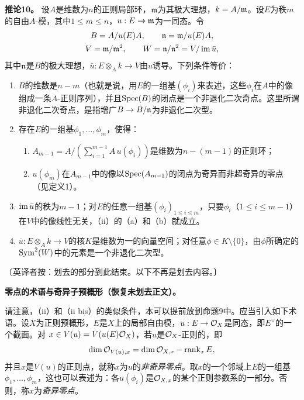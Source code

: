 \noindent\textbf{推论10。}
设$A$是维数为$n$的正则局部环，$\mathfrak m$为其极大理想，$k=A/\mathfrak m$。设$E$为秩$m$的自由$A$-模，其中$1\le m\le n$，$u:E\to\mathfrak m$为一同态。令
\[
\begin{gathered}B=A/u(E)A,\qquad \mathfrak n=\mathfrak m/u(E)A,\\ V=\mathfrak m/\mathfrak m^2,
\qquad W=\mathfrak n/\mathfrak n^2=V/\operatorname{im}\bar u,\end{gathered}
\]
其中$\mathfrak n$是$B$的极大理想，$\bar u:E\otimes_A k\to V$由$u$诱导。下列条件等价：
\begin{enumerate}
\item[(i)] $B$的维数是$n-m$（也就是说，用$E$的一组基$(\phi_i)$来表述，这些$\phi_i$在$A$中的像组成一条$A$-正则序列），并且$\operatorname{Spec}(B)$的闭点是一个非退化二次奇点。这里所谓非退化二次奇点，是指增广$B\to B/\mathfrak n$为非退化二次型。
\item[(ii)] 存在$E$的一组基$\phi_1,\ldots,\phi_m$，使得：
\begin{enumerate}
\item[(a)] $A_{m-1}=A/(\sum_{i=1}^{m-1}A\,u(\phi_i))$是维数为$n-(m-1)$的正则环；
\item[(b)] $u(\phi_m)$在$A_{m-1}$中的像以$\operatorname{Spec}(A_{m-1})$的闭点为奇异而非超奇异的零点（见定义1）。
\end{enumerate}
\item[(ii bis)] $\operatorname{im}\bar u$的秩为$m-1$；对$E$的任意一组基$(\phi_i)_{1\le i\le m}$，只要$\phi_i$（$1\le i\le m-1$）在$V$中的像线性无关，（ii）的（a）和（b）就成立。
\item[(iii)] $\bar u:E\otimes_A k\to V$的核$K$是维数为一的向量空间；对任意$\phi\in K\setminus\{0\}$，由$\phi$所确定的$\operatorname{Sym}^2(W)$中的元素是一个非退化二次型。
\end{enumerate}

\noindent〔英译者按：划去的部分到此结束。以下不再是划去内容。〕

\par\medskip\noindent\textbf{零点的术语与奇异子预概形（恢复未划去正文）。}\par
请注意，（ii）和（ii bis）的类似条件，本可以提前放到命题9中。应当引入如下术语。设$X$为正则预概形，$E$是$X$上的局部自由模，$u:E\to\mathcal O_X$是同态，即$E^\vee$的一个截面。对
$x\in V(u)=V(u(E)\mathcal O_X)$，若$u$是$\mathcal O_X$-正则的，即
\[
\dim\mathcal O_{V(u),x}=\dim\mathcal O_{X,x}-\operatorname{rank}_x E,
\]
并且$x$是$V(u)$的正则点，就称$x$为$u$的\emph{非奇异零点}。取$x$的一个邻域上$E$的一组基$\phi_1,\ldots,\phi_m$，这也可以表述为：各$u(\phi_i)$是$\mathcal O_{X,x}$的某个正则参数系的一部分。否则，称$x$为\emph{奇异零点}。

